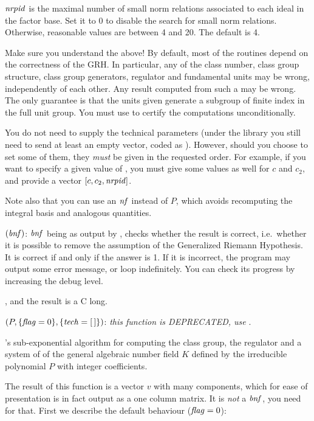 $\hbox{\it nrpid\/}$ is the maximal number of small norm relations associated to each
ideal in the factor base. Set it to $0$ to disable the search for small norm
relations. Otherwise, reasonable values are between 4 and 20. The default is
4.

 Make sure you understand the above! By default, most of
the  routines depend on the correctness of the GRH. In particular,
any of the class number, class group structure, class group generators,
regulator and fundamental units may be wrong, independently of each other.
Any result computed from such a  may be wrong. The only guarantee is
that the units given generate a subgroup of finite index in the full unit
group. You must use  to certify the computations
unconditionally.


You do not need to supply the technical parameters (under the library you
still need to send at least an empty vector, coded as ). However,
should you choose to set some of them, they \emph{must} be given in the
requested order. For example, if you want to specify a given value of
, you must give some values as well for $c$ and $c_2$, and provide
a vector $[c,c_2,\hbox{\it nrpid\/}]$.

Note also that you can use an $\hbox{\it nf\/}$ instead of $P$, which avoids
recomputing the integral basis and analogous quantities.

\smallskip
{}$(\hbox{\it bnf\/})$: $\hbox{\it bnf\/}$ being as output by
, checks whether the result is correct, i.e.~whether it is
possible to remove the assumption of the Generalized Riemann
Hypothesis. It is correct if and only if the answer is 1. If it is
incorrect, the program may output some error message, or loop indefinitely.
You can check its progress by increasing the debug level.

, and the result is a C long.

$(P,\{\hbox{\it f\kern0pt lag\/}=0\},\{\hbox{\it tech\/}=[\,]\})$: \emph{this function
is DEPRECATED, use }.

's sub-exponential algorithm for computing the class group, the
regulator and a system of  of the general algebraic
number field $K$ defined by the irreducible polynomial $P$ with integer
coefficients.

The result of this function is a vector $v$ with many components, which for
ease of presentation is in fact output as a one column matrix. It is
\emph{not} a $\hbox{\it bnf\/}$, you need  for that. First we describe
the default behaviour ($\hbox{\it f\kern0pt lag\/}=0$):

